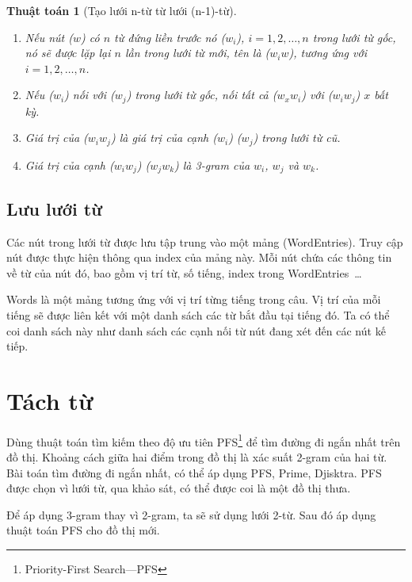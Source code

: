 \documentclass[a4paper,oneside]{book} %
\theoremstyle{break}
\newtheorem{algo}{Thuật toán}
\begin{document}
\begin{algo}[Tạo lưới n-từ từ lưới (n-1)-từ]
\begin{enumerate}
\item Nếu nút ($w$) có $n$ từ đứng liền trước nó ($w_i$),
  $i=1,2,\ldots,n$ trong lưới từ gốc, nó sẽ được lặp lại $n$ lần trong
  lưới từ mới, tên là ($w_{i}w$), tương ứng với $i=1,2,\ldots,n$.
\item Nếu ($w_i$) nối với ($w_j$) trong lưới từ gốc, nối tất cả
  ($w_xw_i$) với ($w_iw_j$) $x$ bất kỳ.
\item Giá trị của ($w_iw_j$) là giá trị của cạnh ($w_i$) ($w_j$) trong
  lưới từ cũ.
\item Giá trị của cạnh ($w_iw_j$) ($w_jw_k$) là 3-gram của $w_i$, $w_j$
  và $w_k$.
\end{enumerate}
\end{algo}



\subsection{Lưu lưới từ}

Các nút trong lưới từ được lưu tập trung vào một mảng
(WordEntries). Truy cập nút được thực hiện thông qua index của mảng
này. Mỗi nút chứa các thông tin về từ của nút đó, bao gồm vị trí từ,
số tiếng, index trong WordEntries~\ldots{}

Words là một mảng tương ứng với vị trí từng tiếng trong câu. Vị trí
của mỗi tiếng sẽ được liên kết với một danh sách các từ bắt đầu tại
tiếng đó. Ta có thể coi danh sách này như danh sách các cạnh nối từ
nút đang xét đến các nút kế tiếp.


\section{Tách từ}
\label{sub:wordseg}

Dùng thuật toán tìm kiếm theo độ ưu tiên PFS\footnote{Priority-First
Search---PFS} để tìm đường đi ngắn nhất trên đồ thị. Khoảng cách giữa hai
điểm trong đồ thị là xác suất 2-gram của hai từ. Bài toán tìm đường
đi ngắn nhất, có thể áp dụng PFS, Prime, Djisktra. PFS được chọn vì
lưới từ, qua khảo sát, có thể được coi là một đồ thị thưa.

Để áp dụng 3-gram thay vì 2-gram, ta sẽ sử dụng lưới 2-từ. Sau đó áp
dụng thuật toán PFS cho đồ thị mới.
\end{document}
